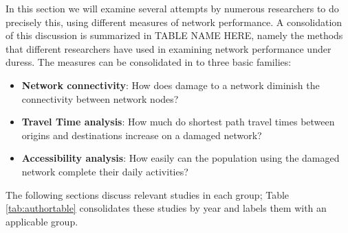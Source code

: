 In this section we will examine several attempts by numerous researchers
to do precisely this,
using different measures of network performance. A consolidation of this
discussion is summarized
in TABLE NAME HERE, namely the methods that different researchers have
used in examining network
performance under duress. The measures can be consolidated in to three
basic families:

\begin{itemize}
	\item \textbf{Network connectivity}: How does damage to a network
	diminish the connectivity
between network nodes?
	\item \textbf{Travel Time analysis}: How much do shortest path travel
	times between origins
and destinations increase on a damaged network?
	\item \textbf{Accessibility analysis}: How easily can the population
	using the damaged
network complete their daily activities?
\end{itemize}

The following sections discuss relevant studies in each group; Table
\ref{tab:authortable} consolidates these studies by year and labels them
with
an applicable group.

